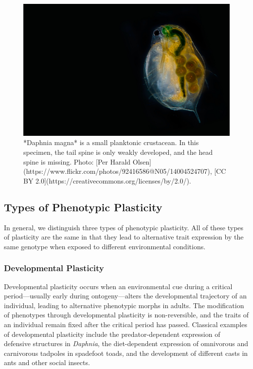 \documentclass[
]{book}
\begin{document}
\begin{figure}
\includegraphics[width=1\linewidth]{images/daphnia} \caption{*Daphnia magna* is a small planktonic crustacean. In this specimen, the tail spine is only weakly developed, and the head spine is missing. Photo: [Per Harald Olsen](https://www.flickr.com/photos/92416586@N05/14004524707), [CC BY 2.0](https://creativecommons.org/licenses/by/2.0/).}\label{fig:daph}
\end{figure}

\hypertarget{types-of-phenotypic-plasticity}{%
\subsection{Types of Phenotypic Plasticity}\label{types-of-phenotypic-plasticity}}

In general, we distinguish three types of phenotypic plasticity. All of these types of plasticity are the same in that they lead to alternative trait expression by the same genotype when exposed to different environmental conditions.

\hypertarget{developmental-plasticity}{%
\subsubsection*{Developmental Plasticity}\label{developmental-plasticity}}

Developmental plasticity occurs when an environmental cue during a critical period---usually early during ontogeny---alters the developmental trajectory of an individual, leading to alternative phenotypic morphs in adults. The modification of phenotypes through developmental plasticity is non-reversible, and the traits of an individual remain fixed after the critical period has passed. Classical examples of developmental plasticity include the predator-dependent expression of defensive structures in \emph{Daphnia}, the diet-dependent expression of omnivorous and carnivorous tadpoles in spadefoot toads, and the development of different casts in ants and other social insects.
\end{document}

